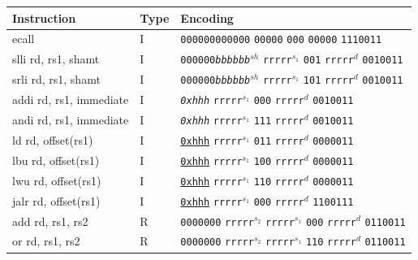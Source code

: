 \documentclass[a4paper,12pt,final]{article}
\begin{document}
\begin{table}[!htbp] \begin{adjustwidth}{-1cm}{-1cm} \fontsize{10}{12.000000}\selectfont
\begin{center}
\begin{tabular}{lll}
\textbf{Instruction} & \textbf{Type} & \textbf{Encoding}\\[0pt]
\hline
ecall & I & \texttt{000000000000}                      \texttt{00000}          \texttt{000} \texttt{00000}          \texttt{1110011}\\[0pt]
\hline
slli rd, rs1, shamt & I & \texttt{000000}​\emph{\texttt{bbbbbb}}​\(^{sh}\)         \texttt{rrrrr}​\(^{s_{1}}\) \texttt{001} \texttt{rrrrr}​\(^{d}\)  \texttt{0010011}\\[0pt]
srli rd, rs1, shamt & I & \texttt{000000}​\emph{\texttt{bbbbbb}}​\(^{sh}\)         \texttt{rrrrr}​\(^{s_{1}}\) \texttt{101} \texttt{rrrrr}​\(^{d}\)  \texttt{0010011}\\[0pt]
addi rd, rs1, immediate & I & \emph{\texttt{0xhhh}}                    \texttt{rrrrr}​\(^{s_{1}}\) \texttt{000} \texttt{rrrrr}​\(^{d}\)  \texttt{0010011}\\[0pt]
andi rd, rs1, immediate & I & \emph{\texttt{0xhhh}}                    \texttt{rrrrr}​\(^{s_{1}}\) \texttt{111} \texttt{rrrrr}​\(^{d}\)  \texttt{0010011}\\[0pt]
\hline
ld  rd, offset(rs1) & I & \uline{\texttt{0xhhh}}                    \texttt{rrrrr}​\(^{s_{1}}\) \texttt{011} \texttt{rrrrr}​\(^{d}\)  \texttt{0000011}\\[0pt]
lbu rd, offset(rs1) & I & \uline{\texttt{0xhhh}}                    \texttt{rrrrr}​\(^{s_{1}}\) \texttt{100} \texttt{rrrrr}​\(^{d}\)  \texttt{0000011}\\[0pt]
lwu rd, offset(rs1) & I & \uline{\texttt{0xhhh}}                    \texttt{rrrrr}​\(^{s_{1}}\) \texttt{110} \texttt{rrrrr}​\(^{d}\)  \texttt{0000011}\\[0pt]
\hline
jalr rd, offset(rs1) & I & \uline{\texttt{0xhhh}}                    \texttt{rrrrr}​\(^{s_{1}}\) \texttt{000} \texttt{rrrrr}​\(^{d}\)  \texttt{1100111}\\[0pt]
\hline
add rd, rs1, rs2 & R & \texttt{0000000} \texttt{rrrrr}​\(^{s_{2}}\) \texttt{rrrrr}​\(^{s_{1}}\) \texttt{000} \texttt{rrrrr}​\(^{d}\)  \texttt{0110011}\\[0pt]
or  rd, rs1, rs2 & R & \texttt{0000000} \texttt{rrrrr}​\(^{s_{2}}\) \texttt{rrrrr}​\(^{s_{1}}\) \texttt{110} \texttt{rrrrr}​\(^{d}\)  \texttt{0110011}\\[0pt]

\end{tabular}
\end{center}
\end{adjustwidth}
\end{table}
\end{document}
